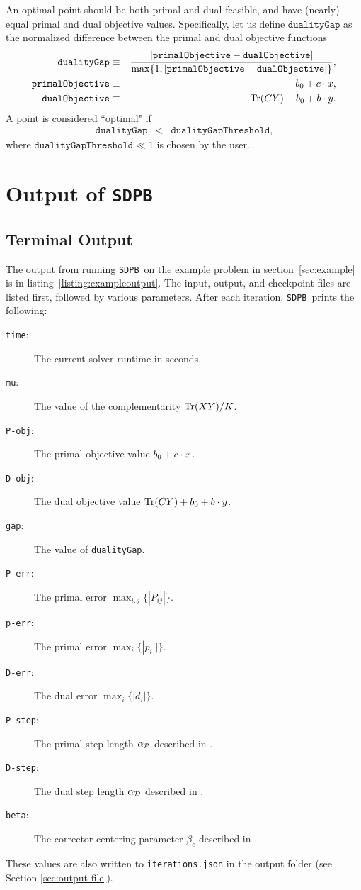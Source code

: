 \documentclass[12pt]{article}
\numberwithin{equation}{section}
\renewcommand{\be}{\begin{eqnarray}}
\renewcommand{\ee}{\end{eqnarray}}
\newcommand\nn{\nonumber}
\newcommand\SDPB{\texttt{SDPB}}
\begin{document}
An optimal point should be both primal and dual feasible, and have (nearly) equal primal and dual objective values.  Specifically, let us define $\texttt{dualityGap}$ as the normalized difference between the primal and dual objective functions
\be
\texttt{dualityGap} &\equiv& \frac{|\texttt{primalObjective} - \texttt{dualObjective}|}{\max\{1, |\texttt{primalObjective} + \texttt{dualObjective}|\}}, \nn\\
\texttt{primalObjective} &\equiv& b_0+c\. x, \nn\\
\texttt{dualObjective} &\equiv& \Tr(CY)+b_0+b\.y.
\ee
A point is considered ``optimal" if
\be
\texttt{dualityGap} &<& \texttt{dualityGapThreshold},
\ee
where $\texttt{dualityGapThreshold} \ll 1$ is chosen by the user.


\section{Output of \SDPB}

\subsection{Terminal Output}
\label{sec:terminal-output}

The output from running \SDPB\ on the example problem in section~\ref{sec:example} is in listing~\ref{listing:exampleoutput}.  The input, output, and checkpoint files are listed first, followed by various parameters.  After each iteration, \SDPB\ prints the following:
\begin{description}
\item[\texttt{time}:] The current solver runtime in seconds.
\item[\texttt{mu}:] The value of the complementarity $\Tr(XY)/K$.
\item[\texttt{P-obj}:] The primal objective value $b_0+c\.x$.
\item[\texttt{D-obj}:] The dual objective value $\Tr(CY)+b_0+b\.y$.
\item[\texttt{gap}:] The value of \texttt{dualityGap}.
\item[\texttt{P-err}:] The primal error $\max_{i,j}\{|P_{ij}|\}$.
\item[\texttt{p-err}:] The primal error $\max_{i}\{|p_i||\}$.
\item[\texttt{D-err}:] The dual error $\max_i\{|d_i|\}$.
\item[\texttt{P-step}:] The primal step length $\alpha_\cP$ described in \cite{DSD}.
\item[\texttt{D-step}:] The dual step length $\alpha_\cD$ described in \cite{DSD}.
\item[\texttt{beta}:]  The corrector centering parameter $\beta_c$ described in \cite{DSD}.
\end{description}
These values are also written to \texttt{iterations.json} in the output folder (see Section \ref{sec:output-file}).
\end{document}
